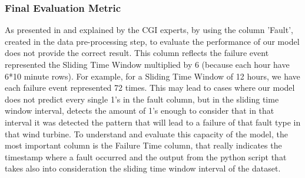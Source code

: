 \subsubsection{Final Evaluation Metric}
As presented in \cite{MED_1} and explained by the CGI experts, by using the column 'Fault', created in the data pre-processing step, to evaluate the performance of our model does not provide the correct result. This column reflects the failure event represented the Sliding Time Window multiplied by 6 (because each hour have 6*10 minute rows). For example, for a Sliding Time Window of 12 hours, we have each failure event represented 72 times. This may lead to cases where our model does not predict every single 1's in the fault column, but in the sliding time window interval, detects the amount of 1's enough to consider that in that interval it was detected the pattern that will lead to a failure of that fault type in that wind turbine. To understand and evaluate this capacity of the model, the most important column is the Failure Time column, that really indicates the timestamp where a fault occurred and the output from the python script that takes also into consideration the sliding time window interval of the dataset.

